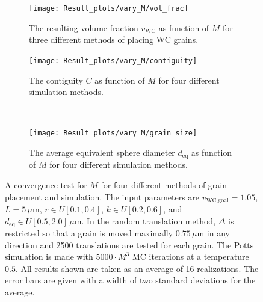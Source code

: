 \documentclass[10pt,a4paper]{article}
\begin{document}
\begin{figure}
	\begin{center}
		\begin{subfigure}[t]{.49\columnwidth}
			\centering
			\texttt{[image: Result\_plots/vary\_M/vol\_frac]}
			\caption{The resulting volume fraction $v_\text{WC}$ as function of $M$ for three different methods of placing WC grains.}
			\label{fig:vary_M_vol_frac}
		\end{subfigure}
		\begin{subfigure}[t]{.49\columnwidth}
			\centering
			\texttt{[image: Result\_plots/vary\_M/contiguity]}
			\caption{The contiguity $C$ as function of $M$ for four different simulation methods.}
			\label{fig:vary_M_contiguity}
		\end{subfigure}
		\\
		\begin{subfigure}[t]{.49\columnwidth}
			\centering
			\texttt{[image: Result\_plots/vary\_M/grain\_size]}
			\caption{The average equivalent sphere diameter $d_\text{eq}$ as function of $M$ for four different simulation methods.}
			\label{fig:vary_M_grain_size}
		\end{subfigure}
		\caption{A convergence test for $M$ for four different methods of grain placement and simulation. The input parameters are $v_\text{WC,goal} = 1.05$, $L=5 \, \mu\text{m}$, $r \in U[0.1, 0.4]$, $k \in U[0.2, 0.6]$, and $d_\text{eq} \in U[0.5, 2.0] \, \mu\text{m}$. In the random translation method, $\Delta$ is restricted so that a grain is moved maximally $0.75 \, \mu \text{m}$ in any direction and 2500 translations are tested for each grain. The Potts simulation is made with $5000 \cdot M^3$ MC iterations at a temperature $0.5$. All results shown are taken as an average of 16 realizations. The error bars are given with a width of two standard deviations for the average.}
		\label{fig:vary_M}
	\end{center}
\end{figure}
\end{document}
